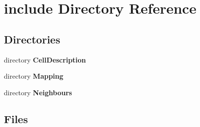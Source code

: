 \section{include Directory Reference}
\label{dir_5e7be9ca2a188dfa5e1e835273c7e598}
\subsection*{Directories}
\begin{DoxyCompactItemize}
\item 
directory {\bf Cell\-Description}
\item 
directory {\bf Mapping}
\item 
directory {\bf Neighbours}
\end{DoxyCompactItemize}
\subsection*{Files}
